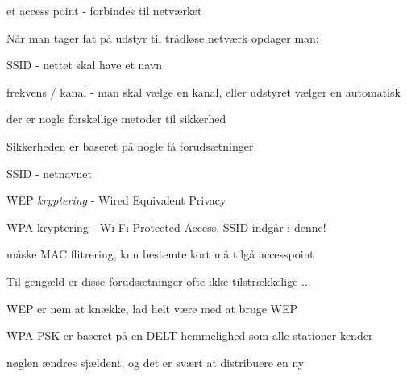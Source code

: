 \documentclass[Screen16to9,17pt]{foils}
\begin{document}


\centerline{\hlkbig et access point - forbindes til netværket}


\begin{list1}
\item Når man tager fat på udstyr til trådløse netværk opdager man:
\item SSID - nettet skal have et navn
\item frekvens / kanal - man skal vælge en kanal, eller udstyret
  vælger en automatisk
\item der er nogle forskellige metoder til sikkerhed
\end{list1}




\begin{list1}
\item Sikkerheden er baseret på nogle få forudsætninger
  \begin{list2}
  \item SSID - netnavnet
  \item WEP \emph{kryptering} - Wired Equivalent Privacy
  \item WPA kryptering - Wi-Fi Protected Access, SSID indgår i denne!
  \item måske MAC flitrering, kun bestemte kort må tilgå accesspoint
  \end{list2}
\end{list1}



\begin{list1}
\item Til gengæld er disse forudsætninger ofte ikke tilstrækkelige ...
  \begin{list2}
  \item WEP er nem at knække, lad helt være med at bruge WEP
  \item WPA PSK er baseret på en DELT hemmelighed som alle stationer kender
  \item nøglen ændres sjældent, og det er svært at distribuere en ny
  \end{list2}
\end{list1}

\end{document}
